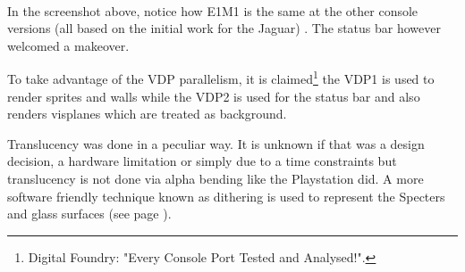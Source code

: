 \\
\par
In the screenshot above, notice how E1M1 is the same at the other console versions (all based on the initial work for the Jaguar) . The status bar however welcomed a makeover.\\
\par
To take advantage of the VDP parallelism, it is claimed\footnote{Digital Foundry: "Every Console Port Tested and Analysed!".} the VDP1 is used to render sprites and walls while the VDP2 is used for the status bar and also renders visplanes which are treated as background.\\
\par 
Translucency was done in a peculiar way. It is unknown if that was a design decision, a hardware limitation or simply due to a time constraints but translucency is not done via alpha bending like the Playstation did. A more software friendly technique known as dithering is used to represent the Specters and glass surfaces (see page \pageref{doomsaturndither}).\\
\par





\par \label{doomsaturndither}


\vspace{-10pt}
\par
{}






\par

